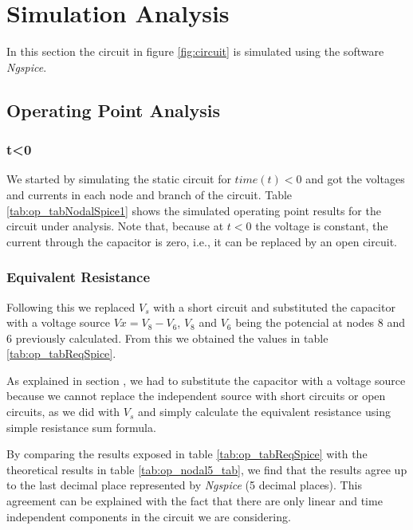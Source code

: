 \section{Simulation Analysis}
\label{sec:simulation}

In this section the circuit in figure \ref{fig:circuit} is simulated
using the software \textit{Ngspice}.

\subsection{Operating Point Analysis}

\subsubsection{t<0}

We started by simulating the static circuit for  $time (t) < 0$ and 
got the voltages and currents in each node and branch of the circuit.
Table \ref{tab:op_tabNodalSpice1} shows the simulated operating 
point results for the circuit under analysis.
Note that, because at $t<0$ the voltage is constant, the current through
the capacitor is zero, i.e., it can be replaced by an open circuit.

\hfill

\subsubsection{Equivalent Resistance}

Following this we replaced $V_s$ with a short circuit and substituted
the capacitor with a voltage source $Vx = V_8-V_6$, $V_8$ and $V_6$
being the potencial at nodes 8 and 6 previously calculated.
From this we obtained the values in table \ref{tab:op_tabReqSpice}. 

As explained in section , we had to substitute 
the capacitor with a voltage source because we cannot replace the 
independent source with short circuits or open circuits, as we did 
with $V_s$ and simply calculate the equivalent resistance using
simple resistance sum formula.

By comparing the results exposed in table \ref{tab:op_tabReqSpice} with the 
theoretical results in table \ref{tab:op_nodal5_tab}, we 
find that the results agree up to the last decimal place represented 
by \textit{Ngspice} (5 decimal places). This agreement can be explained 
with the fact that there are only linear and time independent components 
in the circuit we are considering.


